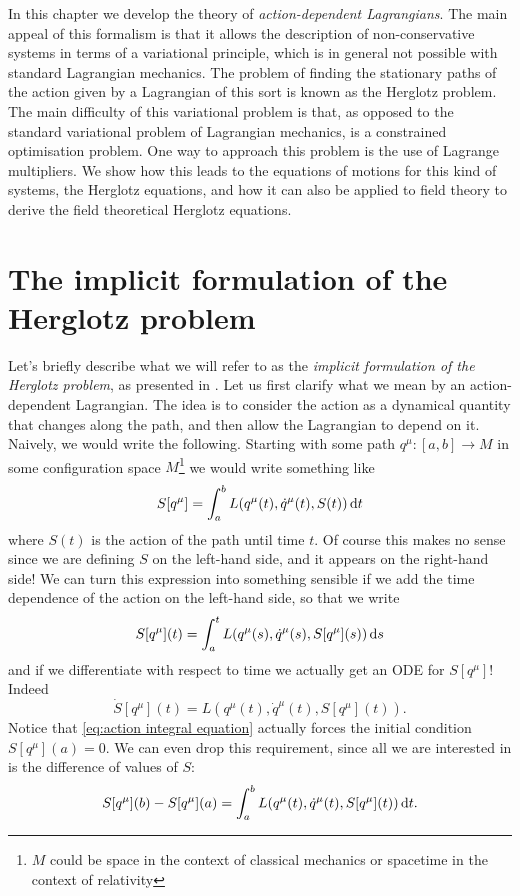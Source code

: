 \documentclass[../main.tex]{subfiles}
\begin{document}
In this chapter we develop the theory of \emph{action-dependent Lagrangians}. The main appeal of
this formalism is that it allows the description of non-conservative systems in terms of a
variational principle, which is in general not possible with standard Lagrangian
mechanics. The problem of finding the stationary paths of the action given by a Lagrangian
of this sort is known as the Herglotz problem. The main difficulty of this variational
problem is that, as opposed to the standard variational problem of Lagrangian mechanics,
is a constrained optimisation problem. One way to approach this problem is the use of
Lagrange multipliers. We show how this leads to the equations of motions for this kind of
systems, the Herglotz equations, and how it can also be applied to field theory to derive
the field theoretical Herglotz equations. 

\section{The implicit formulation of the Herglotz problem}
Let's briefly describe what we will refer to as the \emph{implicit formulation of the
Herglotz problem}, as presented in \cite{Lazo2018}. Let us first clarify what we mean by
an action-dependent Lagrangian. The idea is to consider the action as a dynamical quantity
that changes along the path, and then allow the Lagrangian to depend on it. Naively, we
would write the following. Starting with some path \( q^\mu \colon [a,b] \to M \) in some
configuration space \( M \)\footnote{\( M \) could be space in the context of classical
mechanics or spacetime in the context of relativity} we would
write something like
\begin{equation*}
	S[q^\mu] = \int_a^b L(q^\mu(t), \dot{q}^\mu(t), S(t)) \,\mathrm{d} t
\end{equation*}
where \( S(t) \) is the action of the path until time \( t \). Of course this makes no
sense since we are defining \( S \) on the left-hand side, and it appears on the
right-hand side! We can turn this expression into something sensible if we add the time
dependence of the action on the left-hand side, so that we write
\begin{equation}\label{eq:action integral equation}
	S[q^\mu](t) = \int_a^t L(q^\mu(s), \dot{q}^\mu(s), S[q^\mu](s)) \,\mathrm{d} s
\end{equation}
and if we differentiate with respect to time we actually get an ODE for \( S[q^\mu] \)!
Indeed
\begin{equation} \label{eq:action ode}
	\dot{S}[q^\mu](t) = L(q^\mu(t), \dot{q}^\mu(t), S[q^\mu](t)).
\end{equation}
Notice that \cref{eq:action integral equation} actually forces the initial condition \(
S[q^\mu](a) = 0 \). We can even drop this requirement, since all we are interested in is
the difference of values of \( S \):
\begin{equation}\label{eq:action density 1d}
	S[q^\mu](b) - S[q^\mu](a) = \int_a^b L(q^\mu(t), \dot{q}^\mu(t), S[q^\mu](t)) \,\mathrm{d} t. 
\end{equation}
\end{document}
